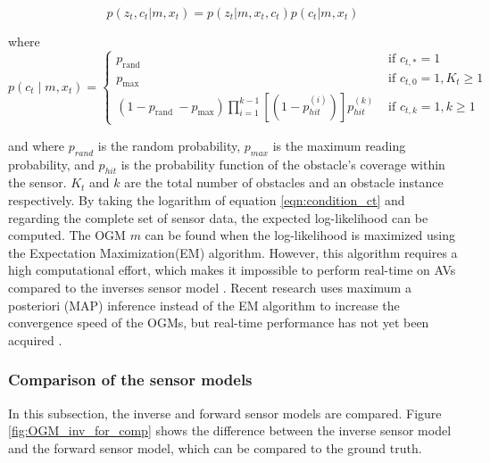 \begin{equation} \label{eqn:condition_ct}
	p(z_t, c_t|m,x_t) = p(z_t|m,x_t,c_t)p(c_t|m,x_t)
\end{equation} 

where 
\hfill \break
\begin{equation} \label{eqn:correspondence_var}
	p\left(c_{t} \mid m, x_{t}\right)=\left\{\begin{array}{ll}
		p_{\text {rand }} & \text { if } c_{t, *}=1 \\
		p_{\max } & \text { if } c_{t, 0}=1, K_{t} \geq 1 \\
		\left(1-p_{\text {rand }}-p_{\max }\right) \prod_{i=1}^{k-1}\left[\left(1-p_{h i t}^{(i)}\right)\right] p_{h i t}^{(k)} & \text { if } c_{t, k}=1, k \geq 1
	\end{array}\right.
\end{equation}
\hfill \break

and where $p_{rand}$ is the random probability, $p_{max}$ is the maximum reading probability, and $p_{hit}$ is the probability function of the obstacle's coverage within the sensor. $K_t$ and $k$ are the total number of obstacles and an obstacle instance respectively. By taking the logarithm of equation \ref{eqn:condition_ct} and regarding the complete set of sensor data, the expected log-likelihood can be computed. The \gls{OGM} $m$ can be found when the log-likelihood is maximized using the Expectation Maximization(EM) algorithm. However, this algorithm requires a high computational effort, which makes it impossible to perform real-time on \glspl{AV} compared to the inverses sensor model \cite{thrun2003learning}. Recent research uses maximum a posteriori (MAP) inference instead of the EM algorithm to increase the convergence speed of the \glspl{OGM}, but real-time performance has not yet been acquired \cite{dhiman2014modern}.


\subsubsection{Comparison of the sensor models} \label{subsub:comp_sens_mod}
In this subsection, the inverse and forward sensor models are compared. Figure \ref{fig:OGM_inv_for_comp} shows the difference between the inverse sensor model and the forward sensor model, which can be compared to the ground truth. 

